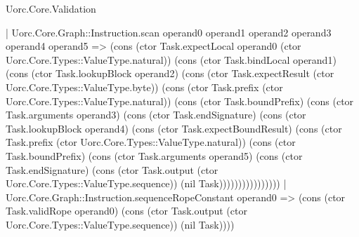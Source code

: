 \begin{lexlean}{Uorc.Core.Validation}
\begin{semanticmodule}
{    | Uorc.Core.Graph::Instruction.scan operand0 operand1 operand2 operand3 operand4 operand5 => (cons (ctor Task.expectLocal operand0 (ctor Uorc.Core.Types::ValueType.natural)) (cons (ctor Task.bindLocal operand1) (cons (ctor Task.lookupBlock operand2) (cons (ctor Task.expectResult (ctor Uorc.Core.Types::ValueType.byte)) (cons (ctor Task.prefix (ctor Uorc.Core.Types::ValueType.natural)) (cons (ctor Task.boundPrefix) (cons (ctor Task.arguments operand3) (cons (ctor Task.endSignature) (cons (ctor Task.lookupBlock operand4) (cons (ctor Task.expectBoundResult) (cons (ctor Task.prefix (ctor Uorc.Core.Types::ValueType.natural)) (cons (ctor Task.boundPrefix) (cons (ctor Task.arguments operand5) (cons (ctor Task.endSignature) (cons (ctor Task.output (ctor Uorc.Core.Types::ValueType.sequence)) (nil Task))))))))))))))))
    | Uorc.Core.Graph::Instruction.sequenceRopeConstant operand0 => (cons (ctor Task.validRope operand0) (cons (ctor Task.output (ctor Uorc.Core.Types::ValueType.sequence)) (nil Task))))
}


\end{semanticmodule}
\end{lexlean}

